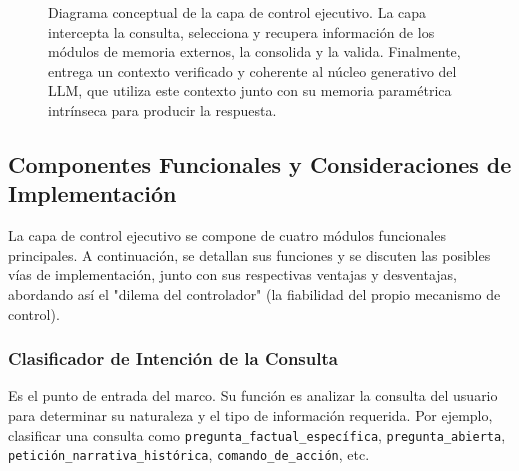 \documentclass[conference]{IEEEtran}
\begin{document}
\begin{figure*}[ht]
\caption{Diagrama conceptual de la capa de control ejecutivo. La capa intercepta la consulta, selecciona y recupera información de los módulos de memoria externos, la consolida y la valida. Finalmente, entrega un contexto verificado y coherente al núcleo generativo del LLM, que utiliza este contexto junto con su memoria paramétrica intrínseca para producir la respuesta.}
\label{fig:arquitectura}
\end{figure*}

\subsection{Componentes Funcionales y Consideraciones de Implementación}
La capa de control ejecutivo se compone de cuatro módulos funcionales principales. A continuación, se detallan sus funciones y se discuten las posibles vías de implementación, junto con sus respectivas ventajas y desventajas, abordando así el "dilema del controlador" (la fiabilidad del propio mecanismo de control).

\subsubsection{Clasificador de Intención de la Consulta}
Es el punto de entrada del marco. Su función es analizar la consulta del usuario para determinar su naturaleza y el tipo de información requerida. Por ejemplo, clasificar una consulta como \texttt{pregunta\_factual\_específica}, \texttt{pregunta\_abierta}, \texttt{petición\_narrativa\_histórica}, \texttt{comando\_de\_acción}, etc.
\end{document}
